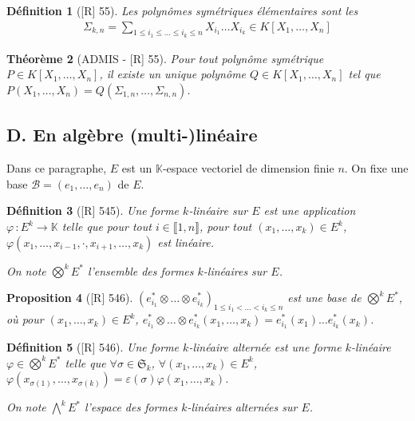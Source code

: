 \documentclass[10pt, a4paper, parskip=full, twoside, twocolumn]{report}
\newtheorem{definition}{Définition}
\newtheorem{theorem}[definition]{Théorème}
\newtheorem{proposition}[definition]{Proposition}
\begin{document}
\begin{definition}[\textnormal{[R] 55}]
	Les \emph{polynômes symétriques élémentaires} sont les 
	\begin{align*}
		\Sigma_{k,n} = \sum_{1\leq i_1\leq\dots\leq i_k\leq n} X_{i_1}\dots X_{i_k}\in K[X_1,\dots,X_n]
	\end{align*}
\end{definition}

\begin{theorem}[ADMIS - \textnormal{[R] 55}]
	Pour tout polynôme symétrique $P\in K[X_1,\dots,X_n]$, il
	existe un unique polynôme $Q\in K[X_1,\dots,X_n]$ tel que 
	$P(X_1,\dots,X_n) = Q(\Sigma_{1,n},\dots,\Sigma_{n,n})$.
\end{theorem}

\subsection*{D. En algèbre (multi-)linéaire}
Dans ce paragraphe, $E$ est un $\mathbb{K}$-espace vectoriel de dimension finie $n$.
On fixe une base $\mathcal{B} = (e_1,\dots,e_n)$ de $E$.
\begin{definition}[\textnormal{[R] 545}]
	Une \emph{forme $k$-linéaire} sur $E$ est une application $\varphi \,\colon E^k\to \mathbb{K}$ telle que pour tout $i\in\llbracket 1,n\rrbracket$, pour tout $(x_1,\dots, x_k)\in E^k$,
	$\varphi(x_1,\dots,x_{i-1}, \cdot, x_{i+1}, \dots, x_k)$ est linéaire.

	On note $\bigotimes^k E^*$ l'ensemble des formes $k$-linéaires sur $E$.
\end{definition}

\begin{proposition}[\textnormal{[R] 546}]
	$\left(e_{i_1}^*\otimes\dots\otimes e_{i_k}^*\right)_{1\leq i_1<\dots < i_k\leq n}$ est une base de $\bigotimes^kE^*$,
	où pour $(x_1,\dots, x_k)\in E^k$, $e_{i_1}^*\otimes\dots\otimes e_{i_k}^*(x_1,\dots, x_k) = e_{i_1}^*(x_1)\dots e_{i_k}^*(x_k)$.
\end{proposition}

\begin{definition}[\textnormal{[R] 546}]
	Une forme $k$-linéaire \emph{alternée} est une forme $k$-linéaire $\varphi\in\bigotimes^kE^*$
	telle que $\forall\sigma\in\mathfrak{S}_k$, $\forall(x_1,\dots, x_k)\in E^k$, $\varphi(x_{\sigma(1)},\dots, x_{\sigma(k)}) = \varepsilon(\sigma)\varphi(x_1,\dots, x_k)$.

	On note $\bigwedge^k E^*$ l'espace des formes $k$-linéaires alternées sur $E$.
\end{definition}
\end{document}
